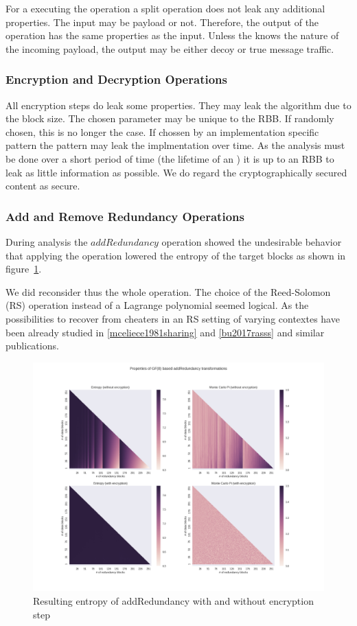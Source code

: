 For a \VortexNode{} executing the operation a split operation does not leak any additional properties. The input may be payload or not. Therefore, the output of the operation has the same properties as the input. Unless the \VortexNodes{} knows the nature of the incoming payload, the output may be either decoy or true message traffic.

\subsubsection{Encryption and Decryption Operations}
All encryption steps do leak some properties. They may leak the algorithm due to the block size. The chosen parameter may be unique to the RBB. If randomly chosen, this is no longer the case. If chossen by an implementation specific pattern the pattern may leak the implmentation over time. As the analysis must be done over a short period of time (the lifetime of an ) it is up to an RBB to leak as little information as possible. We do regard the cryptographically secured content as secure. 

\subsubsection{Add and Remove Redundancy Operations}\label{sec:analysisReedSolomon}
During analysis the $addRedundancy$ operation showed the undesirable behavior that applying the operation lowered the entropy of the target blocks as shown in figure~\ref{fig:entropy}. 

We did reconsider thus the whole operation. The choice of the Reed-Solomon (RS) operation instead of a Lagrange polynomial seemed logical. As the possibilities to recover from cheaters in an RS setting of varying contextes have been already studied in \ref{mceliece1981sharing} and \ref{bu2017rasss} and similar publications.

\begin{figure}[!t]\centering
	\includegraphics[width=1\textwidth]{inc/randomblock_10kb}
	\caption{Resulting entropy of addRedundancy with and without encryption step}
	\label{fig:entropy}
\end{figure}


